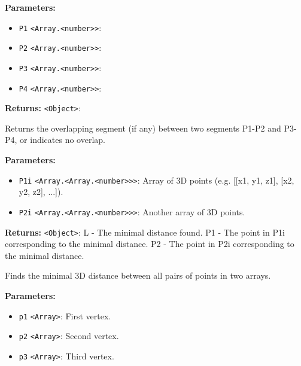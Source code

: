 \documentclass[12pt,a4paper]{article}
\begin{document}
\vspace{5mm}
\noindent {}


\noindent \textbf{Parameters:}
\begin{itemize}
  \item \texttt{P1} \texttt{<Array.<number>>}: 
  \item \texttt{P2} \texttt{<Array.<number>>}: 
  \item \texttt{P3} \texttt{<Array.<number>>}: 
  \item \texttt{P4} \texttt{<Array.<number>>}: 
\end{itemize}

\noindent \textbf{Returns:} \texttt{<Object>}: 

\noindent Returns the overlapping segment (if any) between two segments P1-P2 and P3-P4,
or indicates no overlap.

\vspace{5mm}
\noindent {}


\noindent \textbf{Parameters:}
\begin{itemize}
  \item \texttt{P1i} \texttt{<Array.<Array.<number>>>}: Array of 3D points (e.g. [[x1, y1, z1], [x2, y2, z2], ...]).
  \item \texttt{P2i} \texttt{<Array.<Array.<number>>>}: Another array of 3D points.
\end{itemize}

\noindent \textbf{Returns:} \texttt{<Object>}: L  - The minimal distance found.
  P1 - The point in P1i corresponding to the minimal distance.
  P2 - The point in P2i corresponding to the minimal distance.

\noindent Finds the minimal 3D distance between all pairs of points in two arrays.

\vspace{5mm}
\noindent {}


\noindent \textbf{Parameters:}
\begin{itemize}
  \item \texttt{p1} \texttt{<Array>}: First vertex.
  \item \texttt{p2} \texttt{<Array>}: Second vertex.
  \item \texttt{p3} \texttt{<Array>}: Third vertex.
\end{itemize}
\end{document}
